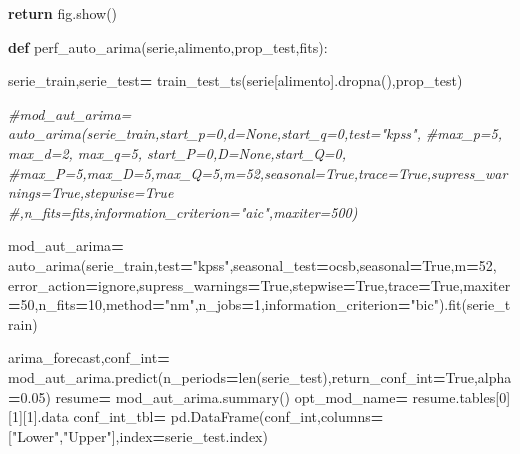 \documentclass[
]{book}
\newenvironment{Shaded}{\begin{snugshade}}{\end{snugshade}}
\newcommand{\BuiltInTok}[1]{#1}
\newcommand{\CommentTok}[1]{\textcolor[rgb]{0.56,0.35,0.01}{\textit{#1}}}
\newcommand{\ControlFlowTok}[1]{\textcolor[rgb]{0.13,0.29,0.53}{\textbf{#1}}}
\newcommand{\DecValTok}[1]{\textcolor[rgb]{0.00,0.00,0.81}{#1}}
\newcommand{\FloatTok}[1]{\textcolor[rgb]{0.00,0.00,0.81}{#1}}
\newcommand{\KeywordTok}[1]{\textcolor[rgb]{0.13,0.29,0.53}{\textbf{#1}}}
\newcommand{\NormalTok}[1]{#1}
\newcommand{\OperatorTok}[1]{\textcolor[rgb]{0.81,0.36,0.00}{\textbf{#1}}}
\newcommand{\StringTok}[1]{\textcolor[rgb]{0.31,0.60,0.02}{#1}}
\newcommand{\VariableTok}[1]{\textcolor[rgb]{0.00,0.00,0.00}{#1}}
\begin{document}
\begin{Shaded}
\begin{Highlighting}[]
      \ControlFlowTok{return}\NormalTok{ fig.show()}



\KeywordTok{def}\NormalTok{ perf\_auto\_arima(serie,alimento,prop\_test,fits):}
  
\NormalTok{    serie\_train,serie\_test}\OperatorTok{=}\NormalTok{ train\_test\_ts(serie[alimento].dropna(),prop\_test)}
  
  \CommentTok{\#mod\_aut\_arima= auto\_arima(serie\_train,start\_p=0,d=None,start\_q=0,test="kpss",}
                 \CommentTok{\#max\_p=5, max\_d=2, max\_q=5, start\_P=0,D=None,start\_Q=0,}
                 \CommentTok{\#max\_P=5,max\_D=5,max\_Q=5,m=52,seasonal=True,trace=True,supress\_warnings=True,stepwise=True}
                 \CommentTok{\#,n\_fits=fits,information\_criterion="aic",maxiter=500)}
                 
\NormalTok{    mod\_aut\_arima}\OperatorTok{=}\NormalTok{ auto\_arima(serie\_train,test}\OperatorTok{=}\StringTok{"kpss"}\NormalTok{,seasonal\_test}\OperatorTok{=}\StringTok{\textquotesingle{}ocsb\textquotesingle{}}\NormalTok{,seasonal}\OperatorTok{=}\VariableTok{True}\NormalTok{,m}\OperatorTok{=}\DecValTok{52}\NormalTok{,}
\NormalTok{                            error\_action}\OperatorTok{=}\StringTok{\textquotesingle{}ignore\textquotesingle{}}\NormalTok{,supress\_warnings}\OperatorTok{=}\VariableTok{True}\NormalTok{,stepwise}\OperatorTok{=}\VariableTok{True}\NormalTok{,trace}\OperatorTok{=}\VariableTok{True}\NormalTok{,maxiter}\OperatorTok{=}\DecValTok{50}\NormalTok{,n\_fits}\OperatorTok{=}\DecValTok{10}\NormalTok{,method}\OperatorTok{=}\StringTok{"nm"}\NormalTok{,n\_jobs}\OperatorTok{=}\DecValTok{1}\NormalTok{,information\_criterion}\OperatorTok{=}\StringTok{"bic"}\NormalTok{).fit(serie\_train)}
                            
                 
\NormalTok{    arima\_forecast,conf\_int}\OperatorTok{=}\NormalTok{ mod\_aut\_arima.predict(n\_periods}\OperatorTok{=}\BuiltInTok{len}\NormalTok{(serie\_test),return\_conf\_int}\OperatorTok{=}\VariableTok{True}\NormalTok{,alpha}\OperatorTok{=}\FloatTok{0.05}\NormalTok{)}
\NormalTok{    resume}\OperatorTok{=}\NormalTok{ mod\_aut\_arima.summary()}
\NormalTok{    opt\_mod\_name}\OperatorTok{=}\NormalTok{ resume.tables[}\DecValTok{0}\NormalTok{][}\DecValTok{1}\NormalTok{][}\DecValTok{1}\NormalTok{].data}
\NormalTok{    conf\_int\_tbl}\OperatorTok{=}\NormalTok{ pd.DataFrame(conf\_int,columns}\OperatorTok{=}\NormalTok{[}\StringTok{"Lower"}\NormalTok{,}\StringTok{"Upper"}\NormalTok{],index}\OperatorTok{=}\NormalTok{serie\_test.index)}
  

\end{Highlighting}
\end{Shaded}
\end{document}
